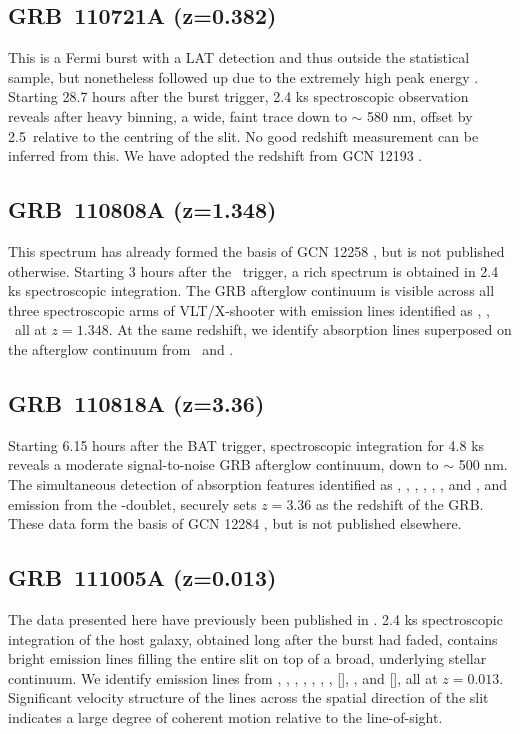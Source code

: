 \documentclass[longauth]{aa}    %
\begin{document}
\subsection{GRB~110721A (z=0.382)} \label{110721}

This is a Fermi burst with a LAT detection and thus outside the statistical
sample, but nonetheless followed up due to the extremely high peak energy
\citep{Axelsson2012}. Starting 28.7 hours after the burst trigger, 2.4 ks
spectroscopic observation reveals after heavy binning, a wide, faint trace down
to $\sim$ 580 nm, offset by 2.5\arcsec~relative to the centring of the slit. No
good redshift measurement can be inferred from this. We have adopted the
redshift from GCN 12193 \citep{GCN12193}.


\subsection{GRB~110808A (z=1.348)} \label{110808}

This spectrum has already formed the basis of GCN 12258 \citep{GCN12258}, but is
not published otherwise. Starting 3 hours after the \swift~trigger, a rich
spectrum is obtained in 2.4 ks spectroscopic integration. The GRB afterglow
continuum is visible across all three spectroscopic arms of VLT/X-shooter with
emission lines identified as \oii, \oiii, \ha~all at $z = 1.348$. At the same
redshift, we identify absorption lines superposed on the afterglow continuum
from \mgii~and \feii.

\subsection{GRB~110818A (z=3.36)} \label{110818}

Starting 6.15 hours after the BAT trigger, spectroscopic integration for 4.8 ks
reveals a moderate signal-to-noise GRB afterglow continuum, down to $\sim$ 500
nm. The simultaneous detection of absorption features identified as \lya, \SIii,
\civ, \alii, \cah, \cak, and \mgii, and emission from the \oiii-doublet,
securely sets $z = 3.36$ as the redshift of the GRB. These data form the basis
of GCN 12284 \citep{GCN12284}, but is not published elsewhere.

\subsection{GRB~111005A (z=0.013)} \label{111005}

The data presented here have previously been published in \citet{Michaowski2016}.
2.4 ks spectroscopic integration of the host galaxy, obtained long after the
burst had faded, contains bright emission lines filling the entire slit on top
of a broad, underlying stellar continuum. We identify emission lines from \oii,
\hd, \hg, \hb, \oiii, \nii, \hb, [\sii], \ariii, and [\siii], all at $z=0.013$.
Significant velocity structure of the lines across the spatial direction of the
slit indicates a large degree of coherent motion relative to the line-of-sight.
\end{document}
